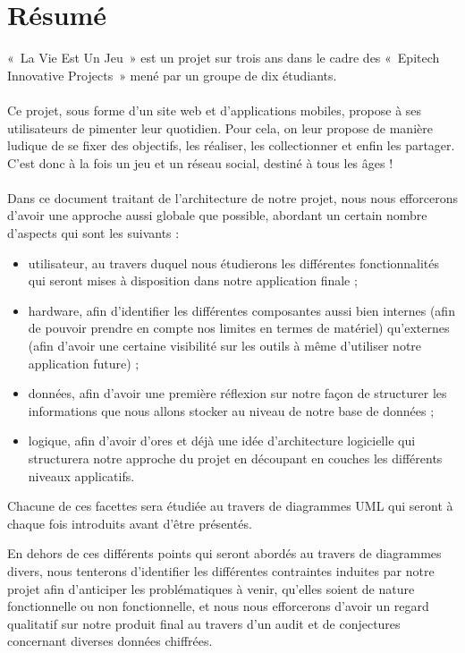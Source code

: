 \documentclass{life-fr}
\begin{document}
\chapter*{Résumé}
{
  «~La Vie Est Un Jeu~» est un projet sur trois ans dans le cadre des «~Epitech
  Innovative Projects~» mené par un groupe de dix étudiants.\\
  \\
  Ce projet, sous forme d'un site web et d'applications mobiles, propose à
  ses utilisateurs de pimenter leur quotidien. Pour cela, on leur propose
  de manière ludique de se fixer des objectifs, les réaliser, les collectionner
  et enfin les partager.\\
  C'est donc à la fois un jeu et un réseau social, destiné à tous les âges !\\
  \\
  Dans ce document traitant de l'architecture de notre projet, nous nous efforcerons d'avoir une approche aussi globale que possible, abordant un certain nombre d’aspects qui sont les suivants :

\begin{itemize}
      \item utilisateur, au travers duquel nous étudierons les différentes fonctionnalités qui seront mises à disposition dans notre application finale ;
      \item hardware, afin d'identifier les différentes composantes aussi bien internes (afin de pouvoir prendre en compte nos limites en termes de matériel) qu'externes (afin d'avoir une certaine visibilité sur les outils à même d'utiliser notre application future) ;
      \item données, afin d'avoir une première réflexion sur notre façon de structurer les informations que nous allons stocker au niveau de notre base de données ;
      \item logique, afin d'avoir d'ores et déjà une idée d'architecture logicielle qui structurera notre approche du projet en découpant en couches les différents niveaux applicatifs.
\end{itemize}

Chacune de ces facettes sera étudiée au travers de diagrammes UML qui seront à chaque fois introduits avant d'être présentés.

En dehors de ces différents points qui seront abordés au travers de diagrammes divers, nous tenterons d'identifier les différentes contraintes induites par notre projet afin d'anticiper les problématiques à venir, qu'elles soient de nature fonctionnelle ou non fonctionnelle, et nous nous efforcerons d'avoir un regard qualitatif sur notre produit final au travers d'un audit et de conjectures concernant diverses données chiffrées.

}
\end{document}
